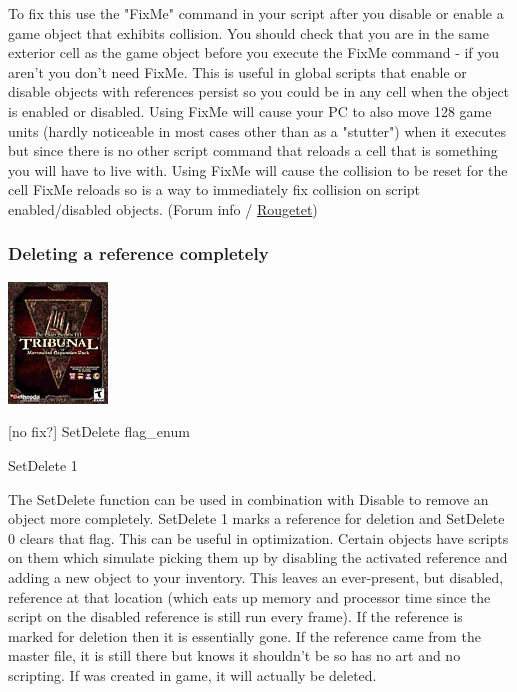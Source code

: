 \documentclass[
]{article}
\begin{document}
To fix this use the "FixMe" command in your script after you disable or
enable a game object that exhibits collision. You should check that you
are in the same exterior cell as the game object before you execute the
FixMe command - if you aren't you don't need FixMe. This is useful in
global scripts that enable or disable objects with references persist so
you could be in any cell when the object is enabled or disabled. Using
FixMe will cause your PC to also move 128 game units (hardly noticeable
in most cases other than as a "stutter") when it executes but since
there is no other script command that reloads a cell that is something
you will have to live with. Using FixMe will cause the collision to be
reset for the cell FixMe reloads so is a way to immediately fix
collision on script enabled/disabled objects. (Forum info /
\href{http://www.bethsoft.com/bgsforums/index.php?showuser=370208}{Rougetet})

\hypertarget{section-5}{%
\subsubsection{}\label{section-5}}

\hypertarget{deleting-a-reference-completely}{%
\subsubsection{Deleting a reference
completely}\label{deleting-a-reference-completely}}

\includegraphics{media/image6.png}

{[}no fix?{]} SetDelete flag\_enum

SetDelete 1

The SetDelete function can be used in combination with Disable to remove
an object more completely. SetDelete 1 marks a reference for deletion
and SetDelete 0 clears that flag. This can be useful in optimization.
Certain objects have scripts on them which simulate picking them up by
disabling the activated reference and adding a new object to your
inventory. This leaves an ever-present, but disabled, reference at that
location (which eats up memory and processor time since the script on
the disabled reference is still run every frame). If the reference is
marked for deletion then it is essentially gone. If the reference came
from the master file, it is still there but knows it shouldn't be so has
no art and no scripting. If was created in game, it will actually be
deleted.
\end{document}
